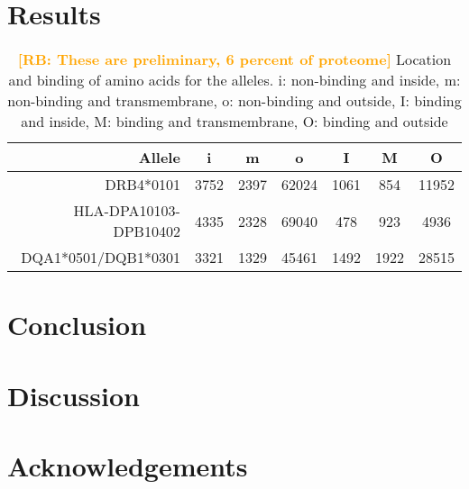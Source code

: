 \documentclass{article}
\newcommand{\richel}[1]{\textcolor{orange}{\textbf{[RB: #1]}}}
\begin{document}
\section{Results}

\begin{table}
\centering
  \begin{tabular}{| r | c | c | c | c | c | c |}
    \hline
    \textbf{Allele}       & \textbf{i} & \textbf{m} & \textbf{o} & \textbf{I} & \textbf{M} & \textbf{O} \\ 
    \hline
    DRB4*0101             & 3752 & 2397 & 62024 & 1061 & 854  & 11952 \\
    HLA-DPA10103-DPB10402 & 4335 & 2328 & 69040 & 478  & 923  & 4936 \\
    DQA1*0501/DQB1*0301   & 3321 & 1329 & 45461 & 1492 & 1922 & 28515 \\
    \hline 
  \end{tabular}
  \caption{
    \richel{These are preliminary, 6 percent of proteome}
    Location and binding of amino acids for the alleles.
    i: non-binding and inside, 
    m: non-binding and transmembrane, 
    o: non-binding and outside, 
    I: binding and inside, 
    M: binding and transmembrane, 
    O: binding and outside
  }
  \label{tab:results}
\end{table}


\section{Conclusion}

\section{Discussion}



\section{Acknowledgements}
\end{document}
